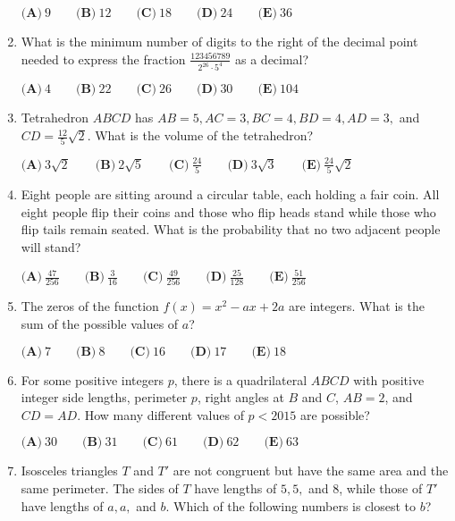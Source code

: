 \documentclass{article}
\begin{document}
\begin{enumerate}[label=\arabic*., itemsep=0.5em]
\(\textbf{(A)}\ 9\qquad\textbf{(B)}\ 12\qquad\textbf{(C)}\ 18\qquad\textbf{(D)}\ 24\qquad\textbf{(E)}\ 36\)\par \vspace{0.5em}\item What is the minimum number of digits to the right of the decimal point needed to express the fraction \(\frac{123456789}{2^{26}\cdot 5^4}\) as a decimal?

\( \textbf{(A)}\ 4\qquad\textbf{(B)}\ 22\qquad\textbf{(C)}\ 26\qquad\textbf{(D)}\ 30\qquad\textbf{(E)}\ 104\)\par \vspace{0.5em}\item Tetrahedron \(ABCD\) has \(AB=5,AC=3,BC=4,BD=4,AD=3,\) and \(CD=\frac{12}{5}\sqrt{2}\). What is the volume of the tetrahedron?

\( \textbf{(A)}\ 3\sqrt{2}\qquad\textbf{(B)}\ 2\sqrt{5}\qquad\textbf{(C)}\ \frac{24}{5}\qquad\textbf{(D)}\ 3\sqrt{3}\qquad\textbf{(E)}\ \frac{24}{5}\sqrt{2}\)\par \vspace{0.5em}\item Eight people are sitting around a circular table, each holding a fair coin. All eight people flip their coins and those who flip heads stand while those who flip tails remain seated. What is the probability that no two adjacent people will stand?

\( \textbf{(A)}\ \frac{47}{256} \qquad\textbf{(B)}\ \frac{3}{16} \qquad\textbf{(C)}\ \frac{49}{256} \qquad\textbf{(D)}\ \frac{25}{128} \qquad\textbf{(E)}\ \frac{51}{256}\)\par \vspace{0.5em}\item The zeros of the function \(f(x) = x^2-ax+2a\) are integers. What is the sum of the possible values of \(a\)?

\( \textbf{(A)}\ 7 \qquad\textbf{(B)}\ 8 \qquad\textbf{(C)}\ 16 \qquad\textbf{(D)}\ 17 \qquad\textbf{(E)}\ 18\)\par \vspace{0.5em}\item For some positive integers \(p\), there is a quadrilateral \(ABCD\) with positive integer side lengths, perimeter \(p\), right angles at \(B\) and \(C\), \(AB=2\), and \(CD=AD\). How many different values of \(p<2015\) are possible?

\( \textbf{(A)}\ 30 \qquad\textbf{(B)}\ 31 \qquad\textbf{(C)}\ 61 \qquad\textbf{(D)}\ 62 \qquad\textbf{(E)}\ 63\)\par \vspace{0.5em}\item Isosceles triangles \(T\) and \(T'\) are not congruent but have the same area and the same perimeter. The sides of \(T\) have lengths of \(5,5,\) and \(8\), while those of \(T'\) have lengths of \(a,a,\) and \(b\). Which of the following numbers is closest to \(b\)?


\end{enumerate}
\end{document}
